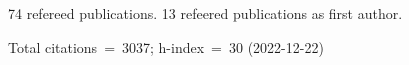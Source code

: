 74 refereed publications. 13 refeered publications as first author.

Total citations~=~3037; h-index~=~30 (2022-12-22)